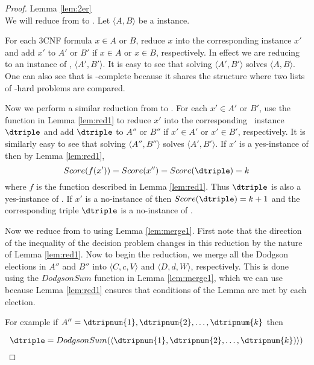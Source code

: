 \begin{proof}{Lemma \ref{lem:2er}}\\
    We will reduce from \csat to .
    Let $\langle A,B \rangle$ be a \csat instance.

    For each 3CNF formula $x \in A$ or $B$, reduce $x$ into
    the corresponding  instance $x'$ and add $x'$
    to $A'$ or $B'$ if $x\in A$ or $x \in B$, respectively.
    In effect we are reducing \csat to an instance of
    , $\langle A', B' \rangle$.
    It is easy to see that solving $\langle A', B' \rangle$
    solves $\langle A, B \rangle$.
    One can also see that  is \tp-complete
    because it shares the structure where two lists of \np-hard
    problems are compared.

    Now we perform a similar reduction from 
    to .
    For each $x' \in A'$ or $B'$, use the function in
    Lemma \ref{lem:red1} to reduce $x'$ into the corresponding
    \dscore~instance $\dtriple$ and add $\dtriple$
    to $A''$ or $B''$ if $x'\in A'$ or $x' \in B'$, respectively.
    It is similarly easy to see that solving $\langle A'', B'' \rangle$
    solves $\langle A', B' \rangle$.
    If $x'$ is a yes-instance of  then by
    Lemma \ref{lem:red1},
    \[Score(f(x')) = Score(x'') = Score(\dtriple) = k\]
    where $f$ is the function described in Lemma \ref{lem:red1}.
    Thus $\dtriple$ is also
    a yes-instance of \dscore.
    If $x'$ is a no-instance of  then
    $Score(\dtriple) = k+1$ and the corresponding triple
    $\dtriple$ is a no-instance of \dscore.

    Now we reduce from  to 
    using Lemma \ref{lem:merge1}.
    First note that the direction of the inequality of the decision problem
    changes in this reduction by the nature of Lemma \ref{lem:red1}.
    Now to begin the reduction, we merge all the Dodgson elections
    in $A''$ and $B''$ into $\langle C,c,V \rangle$ and $\langle D,d,W \rangle$,
    respectively.
    This is done using the $DodgsonSum$ function in Lemma \ref{lem:merge1},
    which we can use because Lemma \ref{lem:red1} ensures that conditions of
    the Lemma are met by each election.

    For example if $A'' = \dtripnum{1},\dtripnum{2}, \dots, \dtripnum{k}$
    then

    \[\dtriple = DodgsonSum(\langle \dtripnum{1},\dtripnum{2}, \dots,
    \dtripnum{k}) \rangle)\]


\end{proof}
